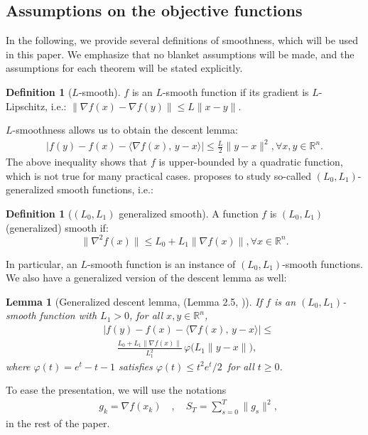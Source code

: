 \documentclass{article}
\theoremstyle{plain}
\newtheorem{lemma}[theorem]{Lemma}
\theoremstyle{definition}
\newtheorem{definition}[theorem]{Definition}
\theoremstyle{remark}
\newcommand{\R}{\mathbb{R}}
\newcommand{\ip}[2]{\langle #1,\, #2 \rangle}
\newcommand{\norm}[1]{\| #1 \|}
\newcommand*{\RR}{\mathbb{R}}
\begin{document}
\subsection{Assumptions on the objective functions}
In the following, we provide several definitions of smoothness, which will be used in this paper. We emphasize that no blanket assumptions will be made, and the assumptions for each theorem will be stated explicitly.
\begin{definition}[$L$-smooth]
\label{def:L-smooth}
$f$ is an $L$-smooth function if its gradient is $L$-Lipschitz, i.e.: $\|\nabla f(x) - \nabla f(y)\| \leq L \|x - y\|$.
\end{definition}
$L$-smoothness allows us to obtain the descent lemma:
\begin{align*}
  |f(y) - f(x) - \ip{\nabla f(x)}{y - x}|
  \leq \frac{L}{2}\norm{y - x}^2, \forall x, y \in \R^n.
\end{align*}
The above inequality shows that $f$ is upper-bounded by a quadratic function, which is not true for many practical cases.
\citet{ZhangKJ2020} proposes to study so-called $(L_0,L_1)$-generalized smooth functions, i.e.:
\begin{definition}[$(L_0,L_1)$ generalized smooth]
\label{def:l0-l1-smooth}
A function $f$ is $(L_0,L_1)$ (generalized) smooth if: 
$$\|\nabla^2 f(x)\| \leq L_0 + L_1 \|\nabla f(x)\|, \forall x \in \RR^n.$$
\end{definition}
In particular, an $L$-smooth function is an instance of $(L_0,L_1)$-smooth functions. We also have a generalized version of the descent lemma as well:
\begin{lemma}[Generalized descent lemma, (Lemma 2.5, \citet{vankov2025optimizing})]
\label{lem:gen-descent}
If $f$ is an $(L_0,L_1)$-smooth function with $L_1 > 0$, for all $x, y \in \R^n$,
\begin{align}
  & \bigl|f(y) - f(x) - \ip{\nabla f(x)}{y-x}\bigr|
  \leq \\
  & \;\;\;\;\; \frac{L_0 + L_1\norm{\nabla f(x)}}{L_1^2}\,
  \varphi\bigl(L_1\norm{y-x}\bigr),\nonumber
\end{align}
where $\varphi(t) = e^t - t - 1$ satisfies
$\varphi(t) \leq t^2 e^t/2$\, for all $t \geq 0$.
\end{lemma}

To ease the presentation, we will use the notations
\begin{align*}
& g_k = \nabla f(x_k) \quad, \quad S_T = \sum_{s=0}^T \norm{g_s}^2,
\end{align*}
in the rest of the paper.
\end{document}
